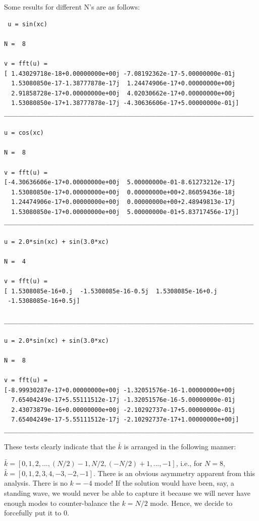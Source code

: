 \documentclass{article}
\begin{document}
Some results for different N's are as follows:
\begin{verbatim}
 u = sin(xc) 

N =  8 

v = fft(u) = 
[ 1.43029718e-18+0.00000000e+00j -7.08192362e-17-5.00000000e-01j
  1.53080850e-17-1.38777878e-17j  1.24474906e-17+0.00000000e+00j
  2.91858728e-17+0.00000000e+00j  4.02030662e-17+0.00000000e+00j
  1.53080850e-17+1.38777878e-17j -4.30636606e-17+5.00000000e-01j]
_____________________________________________________________________

u = cos(xc) 

N =  8 

v = fft(u) = 
[-4.30636606e-17+0.00000000e+00j  5.00000000e-01-8.61273212e-17j
  1.53080850e-17+0.00000000e+00j  0.00000000e+00+2.86059436e-18j
  1.24474906e-17+0.00000000e+00j  0.00000000e+00+2.48949813e-17j
  1.53080850e-17+0.00000000e+00j  5.00000000e-01+5.83717456e-17j]
_____________________________________________________________________

u = 2.0*sin(xc) + sin(3.0*xc) 

N =  4 

v = fft(u) = 
[ 1.5308085e-16+0.j  -1.5308085e-16-0.5j  1.5308085e-16+0.j
 -1.5308085e-16+0.5j]

_____________________________________________________________________

u = 2.0*sin(xc) + sin(3.0*xc) 

N =  8 

v = fft(u) = 
[-8.99930287e-17+0.00000000e+00j -1.32051576e-16-1.00000000e+00j
  7.65404249e-17+5.55111512e-17j -1.32051576e-16-5.00000000e-01j
  2.43073879e-16+0.00000000e+00j -2.10292737e-17+5.00000000e-01j
  7.65404249e-17-5.55111512e-17j -2.10292737e-17+1.00000000e+00j]
_____________________________________________________________________
\end{verbatim}

These tests clearly indicate that the $\bar{k}$ is arranged in the following manner:

$\bar{k} = [0, 1, 2, ..., (N/2)-1, N/2, (-N/2)+1, ..., -1]$, i.e., for $N = 8$, 
$\bar{k} = [0, 1, 2, 3, 4, -3, -2, -1]$. There is an obvious asymmetry apparent from this analysis. There is no $k = -4$ mode! If the solution would have been, say, a standing wave, we would never be able to capture it because we will never have enough modes to counter-balance the $k= N/2$ mode. Hence, we decide to forcefully put it to $0$.
\end{document}
